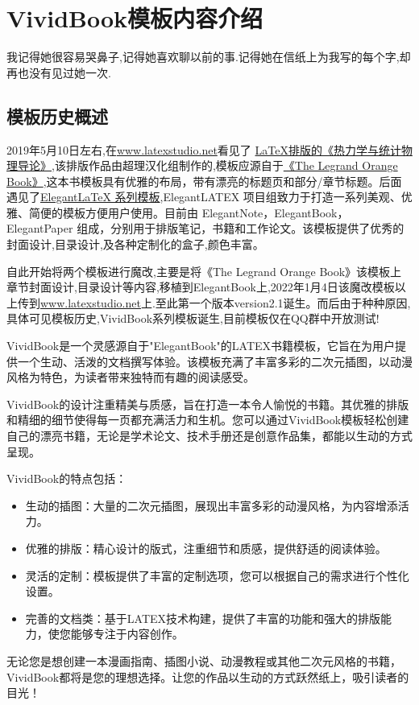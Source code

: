 \chapter{VividBook模板内容介绍}
\begin{center}
    \textcolor[RGB]{255, 0, 0}{\faHeart}我记得她很容易哭鼻子,记得她喜欢聊以前的事.记得她在信纸上为我写的每个字,却再也没有见过她一次.\textcolor[RGB]{255, 0, 0}{\faHeart}
\end{center}
\vspace{-5pt}
\begin{center}
\end{center}

\section{模板历史概述}
2019年5月10日左右,在\href{latexstudio论坛}{www.latexstudio.net}看见了
\href{https://www.latexstudio.net/archives/10715.html}{LaTeX排版的《热力学与统计物理导论》},该排版作品由超理汉化组制作的,模板应源自于\href{http://www.latextemplates.com/template/the-legrand-orange-book}{《The Legrand Orange Book》},这本书模板具有优雅的布局，带有漂亮的标题页和部分/章节标题。后面遇见了\href{https://elegantlatex.org/}{Elegant\LaTeX{} 系列模板},ElegantLATEX 项目组致力于打造一系列美观、优雅、简便的模板方便用户使用。目前由
ElegantNote，ElegantBook，ElegantPaper 组成，分别用于排版笔记，书籍和工作论文。该模板提供了优秀的封面设计,目录设计,及各种定制化的盒子,颜色丰富。

自此开始将两个模板进行魔改,主要是将《The Legrand Orange Book》该模板上章节封面设计,目录设计等内容,移植到ElegantBook上,2022年1月4日该魔改模板以上传到\href{latexstudio论坛}{www.latexstudio.net}上.至此第一个版本version2.1诞生。而后由于种种原因,具体可见模板历史,VividBook系列模板诞生,目前模板仅在QQ群中开放测试!

VividBook是一个灵感源自于"ElegantBook"的LATEX书籍模板，它旨在为用户提供一个生动、活泼的文档撰写体验。该模板充满了丰富多彩的二次元插图，以动漫风格为特色，为读者带来独特而有趣的阅读感受。

VividBook的设计注重精美与质感，旨在打造一本令人愉悦的书籍。其优雅的排版和精细的细节使得每一页都充满活力和生机。您可以通过VividBook模板轻松创建自己的漂亮书籍，无论是学术论文、技术手册还是创意作品集，都能以生动的方式呈现。

VividBook的特点包括：
\begin{itemize}
\item 生动的插图：大量的二次元插图，展现出丰富多彩的动漫风格，为内容增添活力。

\item 优雅的排版：精心设计的版式，注重细节和质感，提供舒适的阅读体验。

\item 灵活的定制：模板提供了丰富的定制选项，您可以根据自己的需求进行个性化设置。

\item 完善的文档类：基于LATEX技术构建，提供了丰富的功能和强大的排版能力，使您能够专注于内容创作。
\end{itemize}
无论您是想创建一本漫画指南、插图小说、动漫教程或其他二次元风格的书籍，VividBook都将是您的理想选择。让您的作品以生动的方式跃然纸上，吸引读者的目光！


